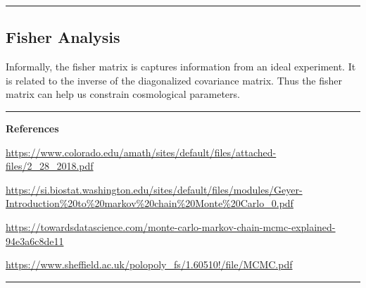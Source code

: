\bigskip
\hrule
\subsection{Fisher Analysis}
Informally, the fisher matrix is captures information from an ideal experiment. It is related to the inverse of the diagonalized covariance matrix.  Thus the fisher matrix can help us constrain cosmological parameters.

\bigskip
\hrule
\textbf{\large References}

\url{https://www.colorado.edu/amath/sites/default/files/attached-files/2_28_2018.pdf}

\url{https://si.biostat.washington.edu/sites/default/files/modules/Geyer-Introduction\%20to\%20markov\%20chain\%20Monte\%20Carlo_0.pdf}

\url{https://towardsdatascience.com/monte-carlo-markov-chain-mcmc-explained-94e3a6c8de11}

\url{https://www.sheffield.ac.uk/polopoly_fs/1.60510!/file/MCMC.pdf}
\hrule
